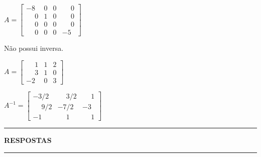 \documentclass[12pt]{exam}
\begin{document}
\begin{exercicio}
  $
    A =\begin{bmatrix}
        -8 & 0 & 0 & \phantom{-} 0\\
        \phantom{-} 0 & 1 & 0 & \phantom{-} 0\\
        \phantom{-} 0 & 0 & 0 & \phantom{-} 0\\
        \phantom{-} 0 & 0 & 0 & -5
    \end{bmatrix}
  $
  \begin{solucao}
   Não possui inversa.
  \end{solucao}
\end{exercicio}

\begin{exercicio}\label{matrizinversafim}
  $
    A =\begin{bmatrix}
        \phantom{-} 1 & 1 & 2\\
        \phantom{-} 3 & 1 & 0\\
        -2 & 0 & 3
    \end{bmatrix}
  $
  \begin{solucao}
    $
      A^{-1} =\begin{bmatrix}
        -3/2 & \phantom{-} 3/2 & \phantom{-} 1\\
        \phantom{-} 9/2 & -7/2 & -3\\
        -1 & \phantom{-} 1 & \phantom{-} 1
      \end{bmatrix}
    $
  \end{solucao}
\end{exercicio}

\newpage
{}
\hrule
\begin{center}
{\large\bf RESPOSTAS}
\end{center}
\hrule

\end{document}
